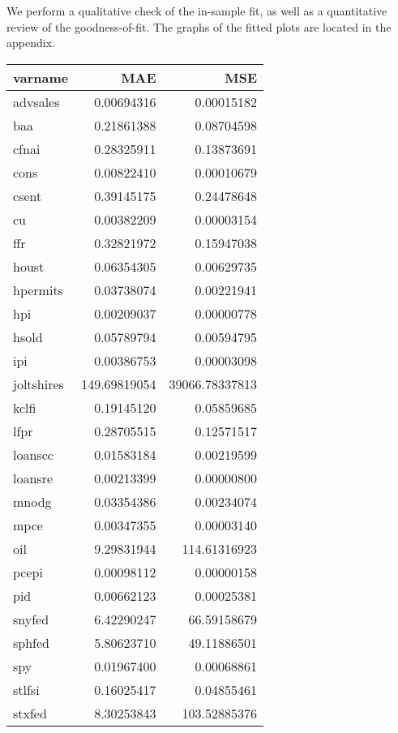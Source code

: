 \documentclass[11pt, letterpaper]{article}\usepackage[]{graphicx}\usepackage[]{color}
\begin{document}
We perform a qualitative check of the in-sample fit, as well as a quantitative review of the goodness-of-fit. The graphs of the fitted plots are located in the appendix.
\begin{table}[H]
\centering
\begingroup\footnotesize
\begin{tabular}{lrr}
  \hline
varname & MAE & MSE \\ 
  \hline
advsales & 0.00694316 & 0.00015182 \\ 
  baa & 0.21861388 & 0.08704598 \\ 
  cfnai & 0.28325911 & 0.13873691 \\ 
  cons & 0.00822410 & 0.00010679 \\ 
  csent & 0.39145175 & 0.24478648 \\ 
  cu & 0.00382209 & 0.00003154 \\ 
  ffr & 0.32821972 & 0.15947038 \\ 
  houst & 0.06354305 & 0.00629735 \\ 
  hpermits & 0.03738074 & 0.00221941 \\ 
  hpi & 0.00209037 & 0.00000778 \\ 
  hsold & 0.05789794 & 0.00594795 \\ 
  ipi & 0.00386753 & 0.00003098 \\ 
  joltshires & 149.69819054 & 39066.78337813 \\ 
  kclfi & 0.19145120 & 0.05859685 \\ 
  lfpr & 0.28705515 & 0.12571517 \\ 
  loanscc & 0.01583184 & 0.00219599 \\ 
  loansre & 0.00213399 & 0.00000800 \\ 
  mnodg & 0.03354386 & 0.00234074 \\ 
  mpce & 0.00347355 & 0.00003140 \\ 
  oil & 9.29831944 & 114.61316923 \\ 
  pcepi & 0.00098112 & 0.00000158 \\ 
  pid & 0.00662123 & 0.00025381 \\ 
  snyfed & 6.42290247 & 66.59158679 \\ 
  sphfed & 5.80623710 & 49.11886501 \\ 
  spy & 0.01967400 & 0.00068861 \\ 
  stlfsi & 0.16025417 & 0.04855461 \\ 
  stxfed & 8.30253843 & 103.52885376 \\ 

\end{tabular}
\end{table}
\end{document}
